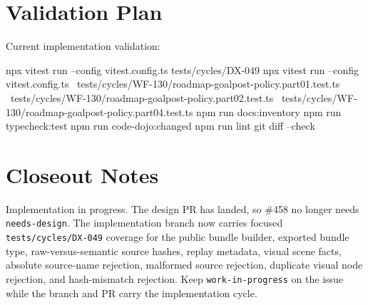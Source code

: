 \section{Validation Plan}\label{record-145-validation-plan}

Current implementation validation:

\begin{CodeBlock}
npx vitest run --config vitest.config.ts tests/cycles/DX-049
npx vitest run --config vitest.config.ts \
  tests/cycles/WF-130/roadmap-goalpost-policy.part01.test.ts \
  tests/cycles/WF-130/roadmap-goalpost-policy.part02.test.ts \
  tests/cycles/WF-130/roadmap-goalpost-policy.part04.test.ts
npm run docs:inventory
npm run typecheck:test
npm run code-dojo:changed
npm run lint
git diff --check
\end{CodeBlock}

\section{Closeout Notes}\label{record-145-closeout-notes}

Implementation in progress. The design PR has landed, so \#458 no longer needs \texttt{n\allowbreak{}e\allowbreak{}e\allowbreak{}d\allowbreak{}s\allowbreak{}-\allowbreak{}d\allowbreak{}e\allowbreak{}s\allowbreak{}i\allowbreak{}g\allowbreak{}n}. The implementation branch now carries focused \texttt{t\allowbreak{}e\allowbreak{}s\allowbreak{}t\allowbreak{}s\allowbreak{}/\allowbreak{}c\allowbreak{}y\allowbreak{}c\allowbreak{}l\allowbreak{}e\allowbreak{}s\allowbreak{}/\allowbreak{}D\allowbreak{}X\allowbreak{}-\allowbreak{}0\allowbreak{}4\allowbreak{}9} coverage for the public bundle builder, exported bundle type, raw-versus-semantic source hashes, replay metadata, visual scene facts, absolute source-name rejection, malformed source rejection, duplicate visual node rejection, and hash-mismatch rejection. Keep \texttt{w\allowbreak{}o\allowbreak{}r\allowbreak{}k\allowbreak{}-\allowbreak{}i\allowbreak{}n\allowbreak{}-\allowbreak{}p\allowbreak{}r\allowbreak{}o\allowbreak{}g\allowbreak{}r\allowbreak{}e\allowbreak{}s\allowbreak{}s} on the issue while the branch and PR carry the implementation cycle.

